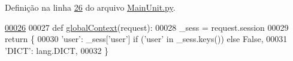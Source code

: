 Definição na linha \hyperlink{MainUnit_8py_source_l00026}{26} do arquivo \hyperlink{MainUnit_8py_source}{Main\-Unit.\-py}.


\begin{DoxyCode}
\hypertarget{namespaceELO_1_1MainUnit_l00026}{}\hyperlink{namespaceELO_1_1MainUnit_a021ebb0ec94aea9dca4014a7218ec38d}{00026} 
00027 \textcolor{keyword}{def }\hyperlink{namespaceELO_1_1MainUnit_a021ebb0ec94aea9dca4014a7218ec38d}{globalContext}(request):
00028     \_sess = request.session
00029     \textcolor{keywordflow}{return} \{
00030             \textcolor{stringliteral}{'user'}: \_sess[\textcolor{stringliteral}{'user'}] \textcolor{keywordflow}{if} (\textcolor{stringliteral}{'user'} \textcolor{keywordflow}{in} \_sess.keys()) \textcolor{keywordflow}{else} \textcolor{keyword}{False},
00031             \textcolor{stringliteral}{'DICT'}: lang.DICT,
00032         \}

\end{DoxyCode}
